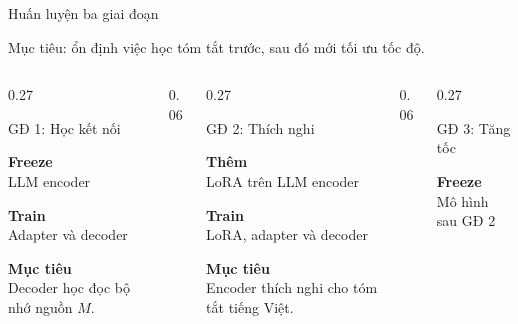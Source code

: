 \documentclass[aspectratio=169,11pt]{beamer}
\begin{document}
\begin{frame}{Huấn luyện ba giai đoạn}
  \vspace{0.2em}
  \begin{center}
    \small\color{blue!65!black} Mục tiêu: ổn định việc học tóm tắt trước, sau đó mới tối ưu tốc độ.
  \end{center}

  \vspace{0.25em}
  \begin{columns}[c,onlytextwidth]
    \begin{column}{0.27\textwidth}
      \begin{block}{GĐ 1: Học kết nối}
        \begin{minipage}[t][3.6cm][t]{\linewidth}
        \footnotesize\raggedright
        \textbf{Freeze}\\
        LLM encoder

        \vspace{0.35em}
        \textbf{Train}\\
        Adapter và decoder

        \vspace{0.35em}
        \textbf{Mục tiêu}\\
        Decoder học đọc bộ nhớ nguồn $M$.
        \end{minipage}
      \end{block}
    \end{column}
    \begin{column}{0.06\textwidth}
      \centering{\Large$\longrightarrow$}
    \end{column}
    \begin{column}{0.27\textwidth}
      \begin{block}{GĐ 2: Thích nghi}
        \begin{minipage}[t][3.6cm][t]{\linewidth}
        \footnotesize\raggedright
        \textbf{Thêm}\\
        LoRA trên LLM encoder

        \vspace{0.35em}
        \textbf{Train}\\
        LoRA, adapter và decoder

        \vspace{0.35em}
        \textbf{Mục tiêu}\\
        Encoder thích nghi cho tóm tắt tiếng Việt.
        \end{minipage}
      \end{block}
    \end{column}
    \begin{column}{0.06\textwidth}
      \centering{\Large$\longrightarrow$}
    \end{column}
    \begin{column}{0.27\textwidth}
      \begin{exampleblock}{GĐ 3: Tăng tốc}
        \begin{minipage}[t][3.6cm][t]{\linewidth}
        \footnotesize\raggedright
        \textbf{Freeze}\\
        Mô hình sau GĐ 2


\end{minipage}
\end{exampleblock}
\end{column}
\end{columns}
\end{frame}
\end{document}
